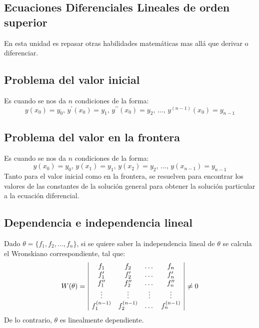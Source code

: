 \documentclass[letterpaper, 12pt]{article}
\begin{document}
    \newpage
    \begin{justify}
        \thispagestyle{fancy}
        \section{Ecuaciones Diferenciales Lineales de orden superior}
        \justify
        En esta unidad es repasar otras habilidades matemáticas mas allá que derivar o diferenciar.
        \subsection{Problema del valor inicial}
        \justify
        Es cuando se nos da \(n\) condiciones de la forma:
        {\large \[y(x_0)=y_0,\, y^{\prime}(x_0)=y_1,\, y^{\prime\prime}(x_0)=y_2,\, \dots, \, y^{(n-1)}(x_0)=y_{n-1}\]}
        \subsection{Problema del valor en la frontera}
        \justify
        Es cuando se nos da \(n\) condiciones de la forma:
        {\large \[y(x_0)=y_0,\, y(x_1)=y_1,\, y(x_2)=y_2,\, \dots,\, y(x_{n-1})=y_{n-1}\]}
        \justify
        Tanto para el valor inicial como en la frontera, se resuelven para encontrar los valores de las constantes de la solución
        general para obtener la solución particular a la ecuación diferencial.
        \subsection{Dependencia e independencia lineal}
        \justify
        Dado \(\theta=\{f_1,f_2,\dots, f_n\}\), si se quiere saber la independencia lineal de \(\theta\) se 
        calcula el Wronskiano correspondiente, tal que: 
        {\large\begin{equation*}
            \begin{aligned}
                W(\theta)=\begin{array}{@{\mkern3mu}|cccc|@{\mkern3mu}}
                    f_1 & f_2 & \dots & f_n\\
                    f^{\prime}_1 & f^{\prime}_2 & \dots & f^{\prime}_n\\
                    f^{\prime\prime}_1 & f^{\prime\prime}_2 & \dots & f^{\prime\prime}_n\\
                    \vdots & \vdots & \vdots & \vdots\\
                    f^{(n-1)}_1 & f^{(n-1)}_2 & \dots & f^{(n-1)}_n
                \end{array}\neq 0
            \end{aligned}
        \end{equation*}}
        De lo contrario, \(\theta\) es linealmente dependiente.

\end{justify}
\end{document}
